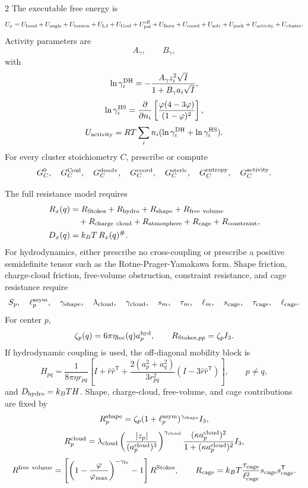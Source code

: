 \documentclass[10pt]{article}
\newcommand{\T}{\mathsf{T}}
\begin{document}
\begin{multicols}{2}
The executable free energy is
\[
U_x=
U_{\rm bond}
+U_{\rm angle}
+U_{\rm torsion}
+U_{\rm LJ}
+U_{\rm Coul}
+U_{\rm pol}^{\rm eff}
+U_{\rm Born}
+U_{\rm coord}
+U_{\rm solv}
+U_{\rm pack}
+U_{\rm activity}
+U_{\rm cluster}.
\]
Activity parameters are
\[
A_\gamma,\qquad B_\gamma,
\]
with
\[
\ln\gamma_i^{\rm DH}
=
-\frac{A_\gamma z_i^2\sqrt I}
{1+B_\gamma a_i\sqrt I},
\]
\[
\ln\gamma_i^{\rm HS}
=
\frac{\partial}{\partial n_i}
\left[
\frac{\varphi(4-3\varphi)}{(1-\varphi)^2}
\right],
\]
\[
U_{\rm activity}
=
RT\sum_i n_i(\ln\gamma_i^{\rm DH}+\ln\gamma_i^{\rm HS}).
\]
For every cluster stoichiometry \(C\), prescribe or compute
\[
G_C^0,\quad G_C^{\rm Coul},\quad G_C^{\rm desolv},\quad
G_C^{\rm coord},\quad G_C^{\rm steric},\quad
G_C^{\rm entropy},\quad G_C^{\rm activity}.
\]

The full resistance model requires
\[
\begin{aligned}
R_x(q)&=
R_{\rm Stokes}
+R_{\rm hydro}
+R_{\rm shape}
+R_{\rm free\ volume}\\
&\quad
+R_{\rm charge\ cloud}
+R_{\rm atmosphere}
+R_{\rm cage}
+R_{\rm constraint},\\
D_x(q)&=k_BT\,R_x(q)^\#.
\end{aligned}
\]
For hydrodynamics, either prescribe no cross-coupling or prescribe a positive
semidefinite tensor such as the Rotne-Prager-Yamakawa form. Shape friction,
charge-cloud friction, free-volume obstruction, constraint resistance, and cage
resistance require
\[
S_p,\quad \ell_p^{\rm asym},\quad \gamma_{\rm shape},
\quad
\lambda_{\rm cloud},\quad \gamma_{\rm cloud},
\quad
s_m,\quad \tau_m,\quad \ell_m,
\quad
s_{\rm cage},\quad \tau_{\rm cage},\quad \ell_{\rm cage}.
\]
For center \(p\),
\[
\zeta_p(q)=6\pi\eta_{\rm loc}(q)a_p^{\rm hyd},
\qquad
R_{{\rm Stokes},pp}=\zeta_pI_3.
\]
If hydrodynamic coupling is used, the off-diagonal mobility block is
\[
H_{pq}
=
\frac{1}{8\pi\eta r_{pq}}
\left[
I+\hat r\hat r^\T
+
\frac{2(a_p^2+a_q^2)}{3r_{pq}^2}
(I-3\hat r\hat r^\T)
\right],
\qquad p\ne q,
\]
and \(D_{\rm hydro}=k_BTH\). Shape, charge-cloud, free-volume, and cage
contributions are fixed by
\[
R_p^{\rm shape}
=
\zeta_p(1+\ell_p^{\rm asym})^{\gamma_{\rm shape}}I_3,
\]
\[
R_p^{\rm cloud}
=
\lambda_{\rm cloud}
\left(\frac{|z_p|}{(a_p^{\rm cloud})^3}\right)^{\gamma_{\rm cloud}}
\frac{(\kappa a_p^{\rm cloud})^2}{1+(\kappa a_p^{\rm cloud})^2}I_3,
\]
\[
R^{\rm free\ volume}
=
\left[
\left(1-\frac{\varphi}{\varphi_{\max}}\right)^{-\gamma_{\rm fv}}-1
\right]R^{\rm Stokes},
\qquad
R_{\rm cage}
=
k_BT\frac{\tau_{\rm cage}}{\ell_{\rm cage}^2}
s_{\rm cage}s_{\rm cage}^\T.
\]


\end{multicols}
\end{document}
